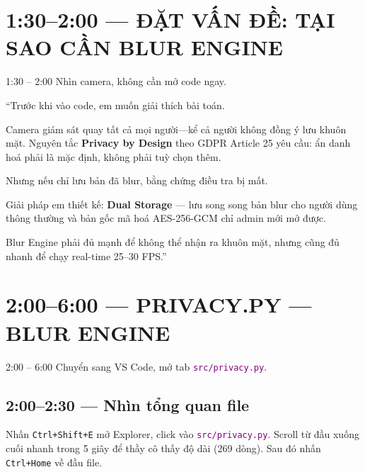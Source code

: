 \documentclass[12pt, a4paper]{article}
\newcommand{\fpath}[1]{\texttt{\textcolor{purple}{#1}}}
\begin{document}
\section{1:30--2:00 --- ĐẶT VẤN ĐỀ: TẠI SAO CẦN BLUR ENGINE}

\begin{timing}{1:30 -- 2:00}
Nhìn camera, không cần mở code ngay.
\end{timing}

\begin{say}
``Trước khi vào code, em muốn giải thích bài toán.

Camera giám sát quay tất cả mọi người---kể cả người không đồng ý lưu khuôn mặt.
Nguyên tắc \textbf{Privacy by Design} theo GDPR Article 25 yêu cầu:
ẩn danh hoá phải là mặc định, không phải tuỳ chọn thêm.

Nhưng nếu chỉ lưu bản đã blur, bằng chứng điều tra bị mất.

Giải pháp em thiết kế: \textbf{Dual Storage} ---
lưu song song bản blur cho người dùng thông thường
và bản gốc mã hoá AES-256-GCM chỉ admin mới mở được.

Blur Engine phải đủ mạnh để không thể nhận ra khuôn mặt,
nhưng cũng đủ nhanh để chạy real-time 25--30 FPS.''
\end{say}

\section{2:00--6:00 --- PRIVACY.PY --- BLUR ENGINE}

\begin{timing}{2:00 -- 6:00}
Chuyển sang VS Code, mở tab \fpath{src/privacy.py}.
\end{timing}

\subsection{2:00--2:30 --- Nhìn tổng quan file}

\begin{doact}
Nhấn \texttt{Ctrl+Shift+E} mở Explorer, click vào \fpath{src/privacy.py}.
Scroll từ đầu xuống cuối nhanh trong 5 giây để thầy cô thấy độ dài (269 dòng).
Sau đó nhấn \texttt{Ctrl+Home} về đầu file.
\end{doact}
\end{document}

